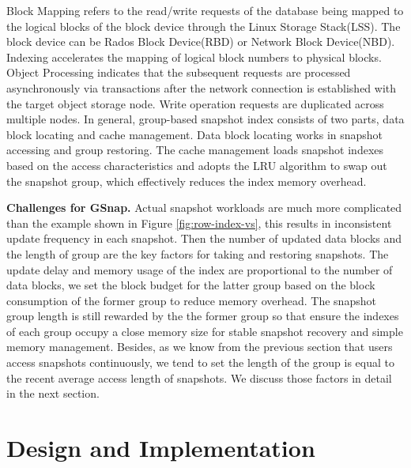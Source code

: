 \documentclass[sigconf, nonacm]{acmart}
\begin{document}
Block Mapping refers to the read/write requests of the database being mapped to the logical blocks of the block device through the Linux Storage Stack(LSS). The block device can be Rados Block Device(RBD) \cite{weil2006ceph} or Network Block Device(NBD). Indexing accelerates the mapping of logical block numbers to physical blocks. Object Processing indicates that the subsequent requests are processed asynchronously via transactions after the network connection is established with the target object storage node. Write operation requests are duplicated across multiple nodes.
In general, group-based snapshot index consists of two parts, data block locating and cache management. Data block locating works in snapshot accessing and group restoring. 
The cache management loads snapshot indexes based on the access characteristics and adopts the LRU algorithm to swap out the snapshot group, which effectively reduces the index memory overhead.

\textbf{Challenges for GSnap.} Actual snapshot workloads are much more complicated than the example shown in Figure \ref{fig:row-index-vs}, this results in inconsistent update frequency in each snapshot. Then the number of updated data blocks and the length of group are the key factors for taking and restoring snapshots.
The update delay and memory usage of the index are proportional to the number of data blocks, we set the block budget for the latter group based on the block consumption of the former group to reduce memory overhead.
The snapshot group length is still rewarded by the the former group so that ensure the indexes of each group occupy a close memory size for stable snapshot recovery and simple memory management. Besides, as we know from the previous section that users access snapshots continuously, we tend to set the length of the group is equal to the recent average access length of snapshots. We discuss those factors in detail in the next section.


\section{Design and Implementation}
\label{Design}
\end{document}
